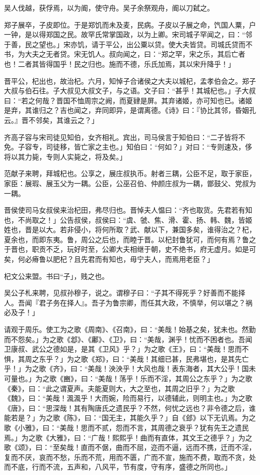 \documentclass[]{article}
\begin{document}
吴人伐越，获俘焉，以为阍，使守舟。吴子余祭观舟，阍以刀弑之。

郑子展卒，子皮即位。于是郑饥而未及麦，民病。子皮以子展之命，饩国人粟，户一钟，是以得郑国之民。故罕氏常掌国政，以为上卿。宋司城子罕闻之，曰：``邻于善，民之望也。」宋亦饥，请于平公，出公粟以贷。使大夫皆贷。司城氏贷而不书，为大夫之无者贷。宋无饥人。叔向闻之，曰：``郑之罕，宋之乐，其后亡者也！二者其皆得国乎！民之归也。施而不德，乐氏加焉，其以宋升降乎！」

晋平公，杞出也，故治杞。六月，知悼子合诸侯之大夫以城杞，孟孝伯会之。郑子大叔与伯石往。子大叔见大叔文子，与之语。文子曰：``甚乎！其城杞也。」子大叔曰：``若之何哉？晋国不恤周宗之阙，而夏肄是屏。其弃诸姬，亦可知也已。诸姬是弃，其谁归之？吉也闻之，弃同即异，是谓离德。《诗》曰：『协比其邻，昏姻孔云。』晋不邻矣，其谁云之？」

齐高子容与宋司徒见知伯，女齐相礼。宾出，司马侯言于知伯曰：``二子皆将不免。子容专，司徒移，皆亡家之主也。」知伯曰：``何如？」对曰：``专则速及，侈将以其力毙，专则人实毙之，将及矣。」

范献子来聘，拜城杞也。公享之，展庄叔执币。射者三耦，公臣不足，取于家臣，家臣：展瑕、展玉父为一耦。公臣，公巫召伯、仲颜庄叔为一耦，鄫鼓父、党叔为一耦。

晋侯使司马女叔侯来治杞田，弗尽归也。晋悼夫人愠曰：``齐也取货。先君若有知也，不尚取之！」公告叔侯，叔侯曰：``虞、虢、焦、滑、霍、扬、韩、魏，皆姬姓也，晋是以大。若非侵小，将何所取？武、献以下，兼国多矣，谁得治之？杞，夏余也，而即东夷。鲁，周公之后也，而睦于晋。以杞封鲁犹可，而何有焉？鲁之于晋也，职贡不乏，玩好时至，公卿大夫相继于朝，史不绝书，府无虚月。如是可矣，何必瘠鲁以肥杞？且先君而有知也，毋宁夫人，而焉用老臣？」

杞文公来盟。书曰``子」，贱之也。

吴公子札来聘，见叔孙穆子，说之。谓穆子曰：``子其不得死乎？好善而不能择人。吾闻『君子务在择人』。吾子为鲁宗卿，而任其大政，不慎举，何以堪之？祸必及子！」

请观于周乐。使工为之歌《周南》、《召南》，曰：``美哉！始基之矣，犹未也。然勤而不怨矣。」为之歌《邶》、《鄘》、《卫》，曰：``美哉，渊乎！忧而不困者也。吾闻卫康叔、武公之德如是，是其《卫风》乎？」为之歌《王》，曰：``美哉！思而不惧，其周之东乎？」为之歌《郑》，曰：``美哉！其细已甚，民弗堪也，是其先亡乎！」为之歌《齐》，曰：``美哉！泱泱乎！大风也哉！表东海者，其大公乎！国未可量也。」为之歌《豳》，曰：``美哉！荡乎！乐而不淫，其周公之东乎？」为之歌《秦》，曰：``此之谓夏声。夫能夏则大，大之至也，其周之旧乎？」为之歌《魏》，曰：``美哉！渢渢乎！大而婉，险而易行，以德辅此，则明主也。」为之歌《唐》，曰：``思深哉！其有陶唐氏之遗民乎？不然，何忧之远也？非令德之后，谁能若是？」为之歌《陈》，曰：``国无主，其能久乎？」自《郐》以下无讥焉。为之歌《小雅》，曰：``美哉！思而不贰，怨而不言，其周德之衰乎？犹有先王之遗民焉。」为之歌《大雅》，曰：``广哉！熙熙乎！曲而有直体，其文王之德乎？」为之歌《颂》，曰：``至矣哉！直而不倨，曲而不屈，迩而不逼，远而不携，迁而不淫，复而不厌，哀而不愁，乐而不荒，用而不匮，广而不宣，施而不费，取而不贪，处而不底，行而不流，五声和，八风平，节有度，守有序，盛德之所同也。」
\end{document}
